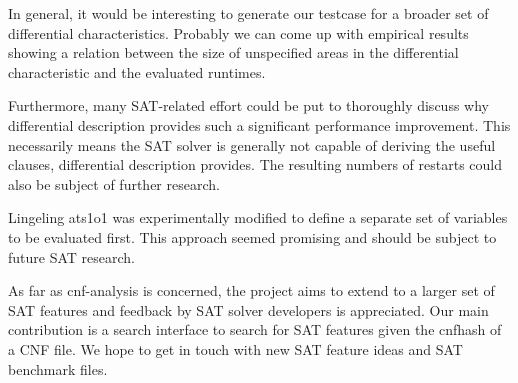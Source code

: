 In general, it would be interesting to generate our testcase for a broader
set of differential characteristics. Probably we can come up with empirical
results showing a relation between the size of unspecified areas in the
differential characteristic and the evaluated runtimes.

Furthermore, many SAT-related effort could be put to thoroughly discuss
why differential description provides such a significant performance improvement.
This necessarily means the SAT solver is generally not capable of deriving
the useful clauses, differential description provides. The resulting
numbers of restarts could also be subject of further research.

Lingeling ats1o1 was experimentally modified to define a separate set of
variables to be evaluated first. This approach seemed promising and
should be subject to future SAT research.

As far as cnf-analysis is concerned, the project aims to extend to
a larger set of SAT features and feedback by SAT solver developers
is appreciated. Our main contribution is a search
interface to search for SAT features given the cnfhash of a CNF file.
We hope to get in touch with new SAT feature ideas and SAT benchmark files.

